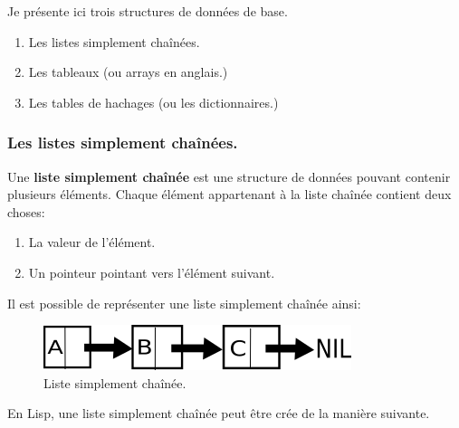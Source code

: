 \documentclass[a4paper, 12pt]{article}
\numberwithin{equation}{subsection}
\begin{document}
Je présente ici trois structures de données de base.
\begin{enumerate}
  \item Les listes simplement chaînées.
  \item Les tableaux (ou arrays en anglais.)
  \item Les tables de hachages (ou les dictionnaires.) \\[0.2cm]
\end{enumerate}

\subsubsection{Les listes simplement chaînées.}
Une {\bf liste simplement chaînée} est une structure de données pouvant contenir plusieurs éléments. Chaque élément appartenant à la liste chaînée contient deux choses:
\begin{enumerate}
  \item La valeur de l'élément.
  \item Un pointeur pointant vers l'élément suivant. \\[0.2cm]
\end{enumerate}

Il est possible de représenter une liste simplement chaînée ainsi: \\
\begin{figure}[H]
  \centering
  \includegraphics[width=9.0cm]{imgs/linked_list.png}
  \caption{Liste simplement chaînée.}
\end{figure}
En Lisp, une liste simplement chaînée peut être crée de la manière suivante. \\
\end{document}
